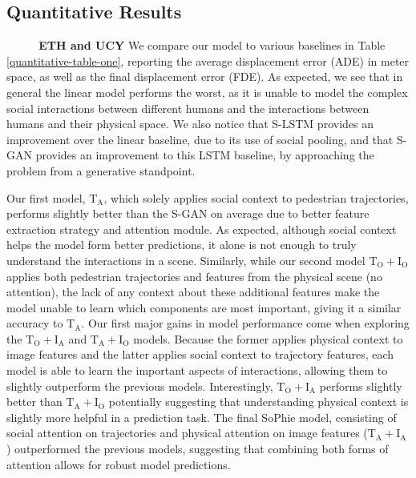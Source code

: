 \documentclass[10pt,twocolumn,letterpaper]{article}
\begin{document}
\subsection{Quantitative Results}
\textbf{~~~~~ETH and UCY} We compare our model to various baselines in Table \ref{quantitative-table-one}, reporting the average displacement error (ADE) in meter space, as well as the final displacement error (FDE). As expected, we see that in general the linear model performs the worst, as it is unable to model the complex social interactions between different humans and the interactions between humans and their physical space. 
We also notice that S-LSTM provides an improvement over the linear baseline, due to its use of social pooling, and that S-GAN provides an improvement to this LSTM baseline, by approaching the problem from a generative standpoint.

Our first model, $\mathrm{T_A}$, which solely applies social context to pedestrian trajectories, performs slightly better than the S-GAN on average due to better feature extraction strategy and attention module. As expected, although social context helps the model form better predictions, it alone is not enough to truly understand the interactions in a scene. Similarly, while our second model $\mathrm{T_O+I_O}$ applies both pedestrian trajectories and features from the physical scene (no attention), the lack of any context about these additional features make the model unable to learn which components are most important, giving it a similar accuracy to $\mathrm{T_A}$. Our first major gains in model performance come when exploring the $\mathrm{T_O+I_A}$ and $\mathrm{T_A+I_O}$ models. Because the former applies physical context to image features and the latter applies social context to trajectory features, each model is able to learn the important aspects of interactions, allowing them to slightly outperform the previous models. Interestingly, $\mathrm{T_O+I_A}$ performs slightly better than $\mathrm{T_A+I_O}$ potentially suggesting that understanding physical context is slightly more helpful in a prediction task. The final SoPhie model, consisting of social attention on trajectories and physical attention on image features ($\mathrm{T_A+I_A}$) outperformed the previous models, suggesting that combining both forms of attention allows for robust model predictions.\\
\end{document}
